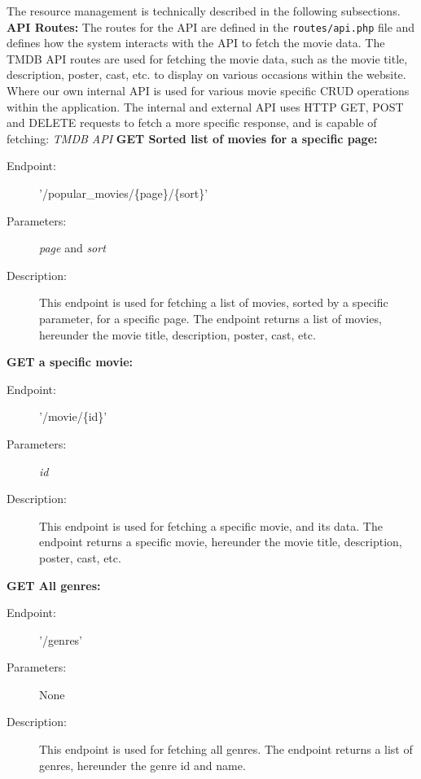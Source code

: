 The resource management is technically described in the following subsections.
\textbf{API Routes:}
The routes for the API are defined in the \texttt{routes/api.php} file and defines how the system interacts with the API to fetch the movie data. The TMDB API routes are used for fetching the movie data, such as the movie title, description, poster, cast, etc. to display on various occasions within the website. Where our own internal API is used for various movie specific CRUD operations within the application. 
The internal and external API uses HTTP GET, POST and DELETE requests to fetch a more specific response, and is capable of fetching:
\textit{TMDB API} \newline\newline
\textbf{GET Sorted list of movies for a specific page:}
\begin{description}
    \item[Endpoint:] '/popular\_movies/\{page\}/\{sort\}'
    \item[Parameters:] \textit{page} and \textit{sort}
    \item[Description:] This endpoint is used for fetching a list of movies, sorted by a specific parameter, for a specific page. The endpoint returns a list of movies, hereunder the movie title, description, poster, cast, etc.
\end{description} 
\textbf{GET a specific movie:}
\begin{description}
    \item [Endpoint:] '/movie/\{id\}'
    \item [Parameters:] \textit{id}
    \item [Description:] This endpoint is used for fetching a specific movie, and its data. The endpoint returns a specific movie, hereunder the movie title, description, poster, cast, etc.
\end{description} 
\textbf{GET All genres:}
\begin{description}
    \item [Endpoint:] '/genres'
    \item [Parameters:] None
    \item [Description:] This endpoint is used for fetching all genres. The endpoint returns a list of genres, hereunder the genre id and name.
\end{description} 

